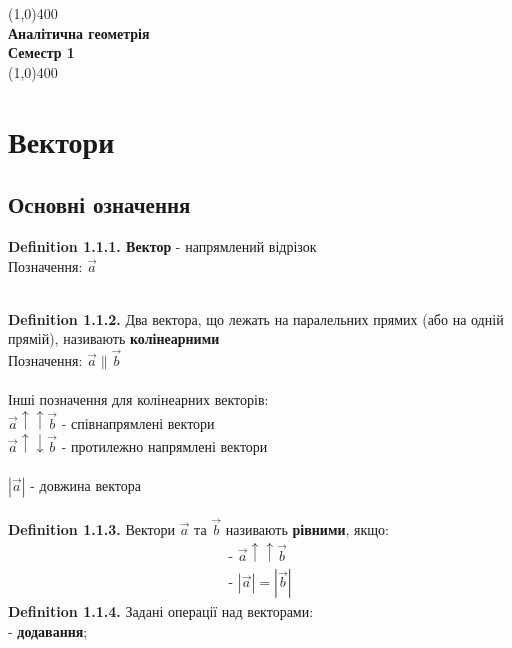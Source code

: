 \documentclass[a4paper, 14pt]{extarticle}
\def\defin#1{\textbf{Definition {#1}}}
\def\bigline{\vspace{5mm}\\}
\begin{document}
	\begin{titlepage}
		\begin{center}
		\hfill
		\vfill
		\line(1,0){400}\\
		\large{\textbf{Аналітична геометрія}}\\[1mm]
		{\textbf{Семестр 1}}\\[1mm]
		\line(1,0){400}\\
		\vfill
        	\end{center}
    	\end{titlepage}
\tableofcontents
\newpage
	
	\section{Вектори}
	\subsection{Основні означення}
	\defin{1.1.1. Вектор} - напрямлений відрізок\\
	Позначення: $\vec{a}$
	\hspace{1cm}
	\bigline
	\defin{1.1.2.} Два вектора, що лежать на паралельних прямих (або на одній прямій), називають \textbf{колінеарними}\\
	Позначення: $\vec{a} \parallel \vec{b}$\\
	\\
	Інші позначення для колінеарних векторів: \\ 
	$\vec{a} \uparrow \uparrow \vec{b}$ - співнапрямлені вектори\\
	$\vec{a} \uparrow \downarrow \vec{b}$ - протилежно напрямлені вектори\\
	\\
	$|\vec{a}|$ - довжина вектора
	\\
	\\
	\defin{1.1.3.} Вектори $\vec{a}$ та $\vec{b}$ називають \textbf{рівними}, якщо:
	\begin{align*}
	\textrm{-  } \vec{a} \uparrow \uparrow \vec{b} \\
	\textrm{-  } |\vec{a}| = |\vec{b}|
	\end{align*}
	\defin{1.1.4.} Задані операції над векторами:\\
	- \textbf{додавання};\\
\end{document}
